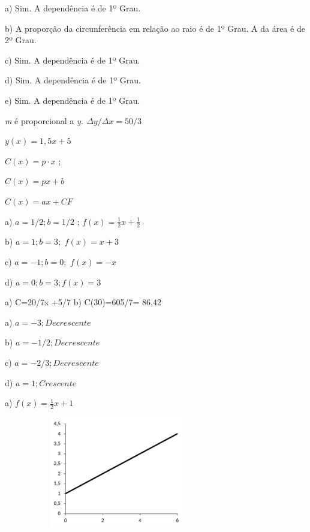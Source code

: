 \begin{respostas}{3}
\ansitem{} a) Sim. A dependência é de 1º Grau.

b) A proporção da circunferência em relação ao raio é de 1º Grau. A da área é de 2º Grau.

c) Sim. A dependência é de 1º Grau.

d) Sim. A dependência é de 1º Grau.

e) Sim. A dependência é de 1º Grau.

\ansitem{} \textit{m }é proporcional a \textit{y.  \(  \Delta y/ \Delta x=50/3 \) }

\ansitem{}  \( y \left( x \right) =1,5x+5 \) 

\ansitem{}  \( C \left( x \right) =p \cdot x \) ; 

\ansitem{}  \( C \left( x \right) =px+b \) 

\ansitem{}  \( C \left( x \right) =ax+CF \) 

\ansitem{} a)  \( a=1/2; b= 1/2 \) ;  \( f \left( x \right) =\frac{1}{2}x+\frac{1}{2} \) \tab \tab 

b)  \( a=1; b= 3; \)   \( f \left( x \right) =x+3 \) \tab \tab 

c) \(  a= -1; b= 0; \)   \( f \left( x \right) =-x \) \tab \tab 

d) \(  a= 0; b= 3; f \left( x \right) =3 \) 

\ansitem{} a) C=20/7x +5/7 \qquad b) C(30)=605/7= 86,42

\ansitem{}

\begin{multicols}{2}
a)  \( a=-3; Decrescente \)

b)  \( a=-1/2; Decrescente \) 

c)  \( a= -2/3; Decrescente \)

d) \(  a=1; Crescente \)
\end{multicols}

\ansitem{} a) \( f \left( x \right) =\frac{1}{2}x+1 \)  

\begin{figure}[H]
	\begin{Center}
		\includegraphics[width=3.07in,height=1.91in]{capitulos/funcao_do_primeiro_grau/media/image42.pdf}
	\end{Center}
\end{figure}


\end{respostas}
